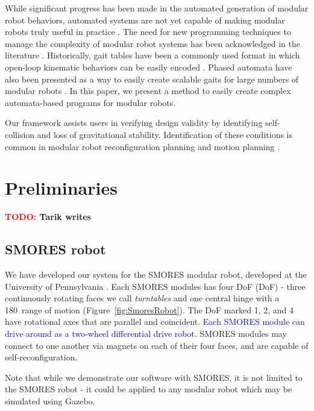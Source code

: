\documentclass[conference]{IEEEtran}
\theoremstyle{definition}
\newcommand{\TODO}[1]{ {\bf \textcolor{red}{TODO:} #1 }}
\newcommand{\changedByJim}[1]{\textcolor{blue}{#1}}
\begin{document}
While significant progress has been made in the automated generation of modular robot behaviors,
automated systems are not yet capable of making modular robots truly useful in practice
\cite{yim2007modular}.  The need for new programming techniques to manage the complexity
of modular robot systems has been acknowledged in the literature \cite{yim2000modular}.
Historically, gait tables have been a commonly used format in which open-loop kinematic
behaviors can be easily encoded \cite{yim1994locomotion}. Phased automata have also
been presented as a way to easily create scalable gaits for large numbers of modular
robots \cite{zhang2003phase}. In this paper, we present a method to easily create
complex automata-based programs for modular robots.

Our framework assists users in verifying design validity by identifying self-collision
and loss of gravitational stability. Identification of these conditions is common
in modular robot reconfiguration planning \cite{casal2001reconfiguration} and motion
planning \cite{yoshida2002self}.

\section{Preliminaries}
\label{sec:preliminaries}
\TODO{Tarik writes}

\subsection{SMORES robot}
We have developed our system for the SMORES modular robot, developed at the
University of Pennsylvania \cite{Davey2012}. Each SMORES modules has four DoF
(DoF) - three continuously rotating faces we call {\em turntables} and one
central hinge with a 180\textdegree\ range of motion (Figure~\ref{fig:SmoresRobot}). The
DoF marked 1, 2, and 4 have rotational axes that are parallel and coincident. \changedByJim{Each SMORES module can drive around as a two-wheel differential drive robot.}
SMORES modules may connect to one another via magnets on each of their four
faces, and are capable of  self-reconfiguration.

Note that while we demonstrate our software with SMORES, it is not limited to the SMORES robot - it could be applied to any modular robot which may be simulated using Gazebo.
\end{document}
